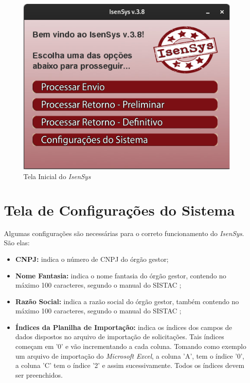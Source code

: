 \documentclass[
	12pt,			%
	openright,		%
	oneside,	
	a4paper,		%
	english,		%
	brazil			%
]{abntex2/abntex2}  %
\begin{document}
			\begin{figure}[ht]
				\begin{center}
					
					\caption{Tela Inicial do \textit{IsenSys}}
					\includegraphics[scale=0.5]{img/inicial}
					
				\end{center}
			\end{figure}

		\section{Tela de Configurações do Sistema}
		
			Algumas configurações são necessárias para o correto funcionamento do \textit{IsenSys}. São elas:
			
			\begin{itemize}
				
				\item \textbf{CNPJ:} indica o número de CNPJ do órgão gestor;
				\item \textbf{Nome Fantasia:} indica o nome fantasia do órgão gestor, contendo no máximo 100 caracteres, segundo o manual do SISTAC \cite{sistac-formatos};
				\item \textbf{Razão Social:} indica a razão social do órgão gestor, também contendo no máximo 100 caracteres, segundo o manual do SISTAC \cite{sistac-formatos};
				\item \textbf{Índices da Planilha de Importação:} indica os índices dos campos de dados dispostos no arquivo de importação de solicitações. Tais índices começam em '0' e vão incrementando a cada coluna. Tomando como exemplo um arquivo de importação do \textit{Microsoft Excel}, a coluna 'A', tem o índice '0', a coluna 'C' tem o índice '2' e assim sucessivamente. Todos os índices devem ser preenchidos.
				
			\end{itemize}
			
\end{document}

